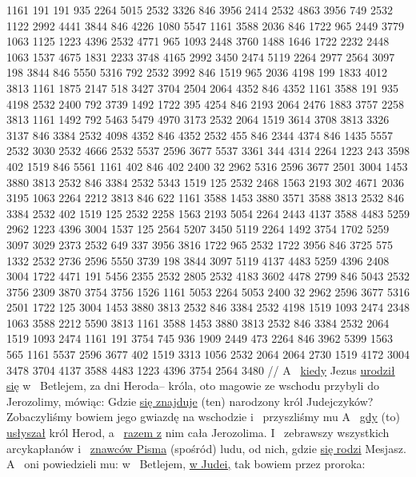 {} 1161 191 {} 191 935 2264 5015 2532 3326 846 3956 2414
{} 2532 4863 3956 749 2532 1122 {} 2992 4441 3844 846 4226 1080 5547
{} 1161 3588 2036 846 1722 965 2449 3779 1063 1125 1223 4396
{} 2532 4771 965 1093 2448 3760 1488 1646 1722 2232 2448 1063 1537 4675 1831 2233 3748 4165 2992 3450 2474
{} 5119 2264 2977 2564 3097 198 3844 846 {} 5550 5316 792
{} 2532 3992 846 1519 965 2036 4198 199 1833 4012 3813 1161 1875 {} 2147 518 3427 3704 2504 2064 {} 4352 846 4352
{} 1161 3588 191 935 4198 2532 2400 792 3739 1492 1722 395 4254 846 2193 2064 {} 2476 1883 {} 3757 2258 3813
{} 1161 1492 792 5463 5479 4970 3173
{} 2532 2064 1519 3614 3708 3813 3326 3137 846 3384 2532 4098 4352 846 4352 2532 455 846 2344 4374 846 1435 5557 2532 3030 2532 4666
{} 2532 5537 2596 3677 5537 {} 3361 344 4314 2264 1223 243 3598 402 1519 846 5561
{} 1161 402 846 402 2400 32 2962 5316 2596 3677 2501 3004 1453 3880 3813 2532 846 3384 2532 5343 1519 125 2532 2468 1563 2193 302 4671 2036 3195 1063 2264 2212 3813 {} 846 622
{} 1161 3588 1453 3880 3571 3588 3813 2532 846 3384 2532 402 1519 125
{} 2532 2258 1563 2193 5054 {} 2264 2443 4137 3588 4483 5259 2962 1223 4396 3004 1537 125 2564 5207 3450 {}
{} 5119 2264 1492 3754 1702 5259 3097 3029 2373 2532 649 {} 337 3956 3816 1722 965 2532 1722 3956 846 3725 575 1332 {} 2532 2736 {} 2596 5550 {} 3739 198 3844 3097
{} 5119 4137 {} 4483 5259 4396 2408 3004
{} 1722 4471 191 5456 2355 2532 2805 2532 4183 3602 4478 2799 846 5043 2532 3756 2309 3870 3754 {} 3756 1526 {}
{} 1161 5053 2264 5053 {} 2400 32 2962 2596 3677 5316 2501 1722 125
{} 3004 1453 3880 3813 2532 846 3384 2532 4198 1519 1093 2474 2348 1063 3588 2212 5590 3813
{} 1161 3588 1453 3880 3813 2532 846 3384 2532 2064 1519 1093 2474
{} 1161 191 3754 745 936 1909 2449 473 2264 846 3962 5399 1563 565 1161 5537 2596 3677 402 1519 3313 1056
{} 2532 2064 {} 2064 2730 1519 4172 3004 3478 3704 4137 3588 4483 1223 4396 3754 2564 3480
//
\glb
 A~ \underline{kiedy} Jezus \underline{urodził się} w~ Betlejem,  za dni Heroda– króla, oto magowie ze wschodu przybyli do Jerozolimy,
 mówiąc: Gdzie \underline{się znajduje} (ten) narodzony król Judejczyków? Zobaczyliśmy bowiem jego gwiazdę na wschodzie i~ przyszliśmy  mu 
 A~ \underline{gdy} (to) \underline{usłyszał} król Herod,  a~ \underline{razem z} nim cała Jerozolima.
 I~ zebrawszy wszystkich arcykapłanów i~ \underline{znawców Pisma} (spośród) ludu,  od nich, gdzie \underline{się rodzi} Mesjasz.
 A~ oni powiedzieli mu: w~ Betlejem, \underline{w Judei,} tak bowiem  przez proroka:

